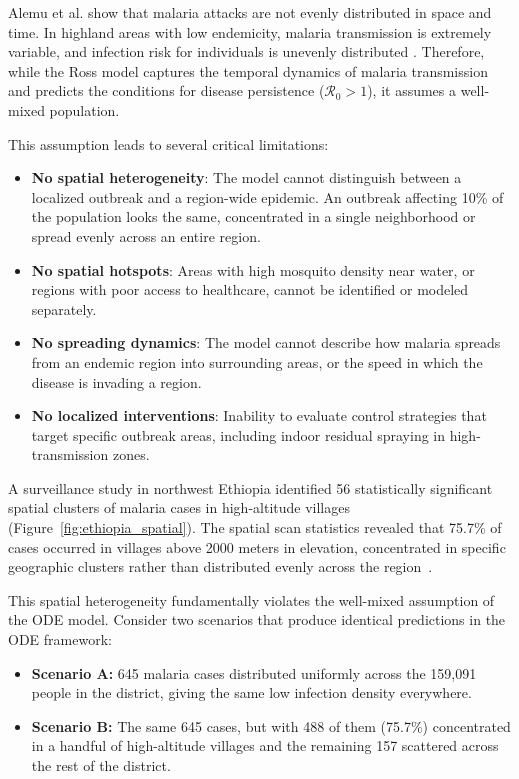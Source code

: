 \documentclass[12pt]{article}
\begin{document}
Alemu et al. show that malaria attacks are not evenly distributed in space and time. In highland areas with low endemicity, malaria transmission is extremely variable, and infection risk for individuals is unevenly distributed \cite{Alemu2014}. Therefore, while the Ross model captures the temporal dynamics of malaria transmission and predicts the conditions for disease persistence ($\mathcal{R}_0 > 1$), it assumes a well-mixed population.

This assumption leads to several critical limitations:

\begin{itemize}
    \item \textbf{No spatial heterogeneity}: The model cannot distinguish between a localized outbreak and a region-wide epidemic. An outbreak affecting 10\% of the population looks the same, concentrated in a single neighborhood or spread evenly across an entire region.
    
    \item \textbf{No spatial hotspots}: Areas with high mosquito density near water, or regions with poor access to healthcare, cannot be identified or modeled separately.
    
    \item \textbf{No spreading dynamics}: The model cannot describe how malaria spreads from an endemic region into surrounding areas, or the speed in which the disease is invading a region.  
    
    \item \textbf{No localized interventions}: Inability to evaluate control strategies that target specific outbreak areas, including indoor residual spraying in high-transmission zones.
\end{itemize}

A surveillance study in northwest Ethiopia identified 56 statistically significant spatial clusters of malaria cases in high-altitude villages
(Figure~\ref{fig:ethiopia_spatial}). The spatial scan statistics revealed
that 75.7\% of cases occurred in villages above 2000 meters in elevation,
concentrated in specific geographic clusters rather than distributed evenly
across the region~\cite{Alemu2014}.

This spatial heterogeneity fundamentally violates the well-mixed assumption
of the ODE model. Consider two scenarios that produce identical predictions
in the ODE framework:
\begin{itemize}
    \item \textbf{Scenario A:} 645 malaria cases distributed uniformly
    across the 159{,}091 people in the district, giving the same low
    infection density everywhere.

    \item \textbf{Scenario B:} The same 645 cases, but with 488 of them
    (75.7\%) concentrated in a handful of high-altitude villages and the
    remaining 157 scattered across the rest of the district.
\end{itemize}
\end{document}
